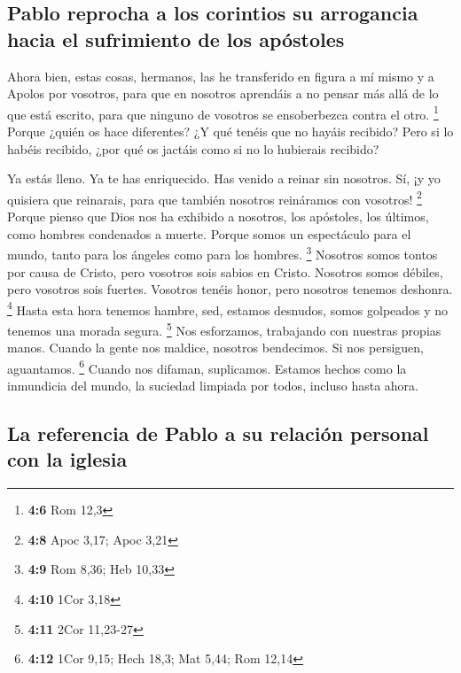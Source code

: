 \begin{paracol}{2}
\hypertarget{pablo-reprocha-a-los-corintios-su-arrogancia-hacia-el-sufrimiento-de-los-apuxf3stoles}{%
\subsection{Pablo reprocha a los corintios su arrogancia hacia el
sufrimiento de los
apóstoles}\label{pablo-reprocha-a-los-corintios-su-arrogancia-hacia-el-sufrimiento-de-los-apuxf3stoles}}

 Ahora bien, estas cosas, hermanos, las he transferido en
figura a mí mismo y a Apolos por vosotros, para que en nosotros
aprendáis a no pensar más allá de lo que está escrito, para que ninguno
de vosotros se ensoberbezca contra el otro. \footnote{\textbf{4:6} Rom
  12,3}  Porque ¿quién os hace diferentes? ¿Y qué tenéis
que no hayáis recibido? Pero si lo habéis recibido, ¿por qué os jactáis
como si no lo hubierais recibido?

 Ya estás lleno. Ya te has enriquecido. Has venido a
reinar sin nosotros. Sí, ¡y yo quisiera que reinarais, para que también
nosotros reináramos con vosotros! \footnote{\textbf{4:8} Apoc 3,17; Apoc
  3,21}  Porque pienso que Dios nos ha exhibido a
nosotros, los apóstoles, los últimos, como hombres condenados a muerte.
Porque somos un espectáculo para el mundo, tanto para los ángeles como
para los hombres. \footnote{\textbf{4:9} Rom 8,36; Heb 10,33}
 Nosotros somos tontos por causa de Cristo, pero vosotros
sois sabios en Cristo. Nosotros somos débiles, pero vosotros sois
fuertes. Vosotros tenéis honor, pero nosotros tenemos deshonra.
\footnote{\textbf{4:10} 1Cor 3,18}  Hasta esta hora
tenemos hambre, sed, estamos desnudos, somos golpeados y no tenemos una
morada segura. \footnote{\textbf{4:11} 2Cor 11,23-27} 
Nos esforzamos, trabajando con nuestras propias manos. Cuando la gente
nos maldice, nosotros bendecimos. Si nos persiguen, aguantamos.
\footnote{\textbf{4:12} 1Cor 9,15; Hech 18,3; Mat 5,44; Rom 12,14}
 Cuando nos difaman, suplicamos. Estamos hechos como la
inmundicia del mundo, la suciedad limpiada por todos, incluso hasta
ahora.

\hypertarget{la-referencia-de-pablo-a-su-relaciuxf3n-personal-con-la-iglesia}{%
\subsection{La referencia de Pablo a su relación personal con la
iglesia}\label{la-referencia-de-pablo-a-su-relaciuxf3n-personal-con-la-iglesia}}


\end{paracol}
